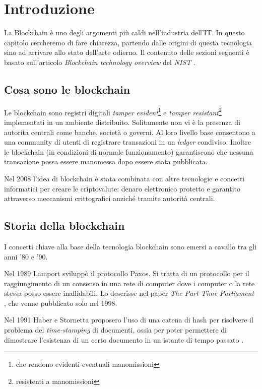 \chapter{Introduzione}

La Blockchain è uno degli argomenti più caldi nell'industria dell'IT. In questo
capitolo cercheremo di fare chiarezza, partendo dalle origini di questa tecnologia
sino ad arrivare allo stato dell'arte odierno.
Il contenuto delle sezioni seguenti è basato sull'articolo
\textit{Blockchain technology overview} del \textit{NIST} \cite{yaga2018blockchain}.

\section{Cosa sono le blockchain}
Le blockchain sono registri digitali
\textit{tamper evident}\footnote{che rendono evidenti eventuali manomissioni}
e \textit{tamper resistant}\footnote{resistenti a manomissioni}
implementati in un ambiente distribuito.
Solitamente non vi è la presenza di autorita centrali come banche, società o governi.
Al loro livello base consentono a una community di utenti di registrare
transazioni in un \textit{ledger} condiviso.
Inoltre le blockchain (in condizioni di normale funzionamento) garantiscono che
nessuna transazione possa essere manomessa dopo essere stata pubblicata.

Nel 2008 l'idea di blockchain
è stata combinata con altre tecnologie e concetti informatici
per creare le criptovalute:
denaro elettronico protetto e garantito attraverso meccanismi crittografici anziché
tramite autorità centrali.

\section{Storia della blockchain}
I concetti chiave alla base della tecnologia blockchain sono emersi a cavallo tra gli anni '80 e '90.

Nel 1989 Lamport sviluppò il protocollo Paxos. Si tratta di
un protocollo per il raggiungimento di un consenso in una rete di computer
dove i computer o la rete stessa posso essere inaffidabili. Lo descrisse nel paper
\textit{The Part-Time Parliament} \cite{lamport1998part},
che venne pubblicato solo nel 1998.

Nel 1991 Haber e Stornetta proposero l'uso di una catena di hash
per risolvere il problema del \textit{time-stamping} di documenti,
ossia per poter permettere di dimostrare l'esistenza di un certo
documento in un istante di tempo passato \cite{haber1990time}.

